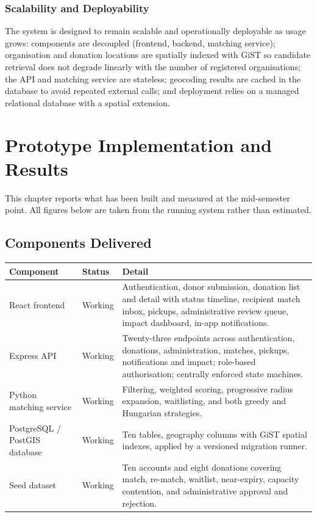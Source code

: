 \documentclass[12pt,a4paper]{report}
\begin{document}
\subsection{Scalability and Deployability}

The system is designed to remain scalable and operationally deployable as usage grows: components are decoupled (frontend, backend, matching service); organisation and donation locations are spatially indexed with GiST so candidate retrieval does not degrade linearly with the number of registered organisations; the API and matching service are stateless; geocoding results are cached in the database to avoid repeated external calls; and deployment relies on a managed relational database with a spatial extension.

\chapter{Prototype Implementation and Results}

This chapter reports what has been built and measured at the mid-semester point. All figures below are taken from the running system rather than estimated.

\section{Components Delivered}

\begin{longtable}{@{}p{3cm}p{2.2cm}p{8.3cm}@{}}
\toprule
\textbf{Component} & \textbf{Status} & \textbf{Detail} \\
\midrule
\endhead
React frontend & Working & Authentication, donor submission, donation list and detail with status timeline, recipient match inbox, pickups, administrative review queue, impact dashboard, in-app notifications. \\
Express API & Working & Twenty-three endpoints across authentication, donations, administration, matches, pickups, notifications and impact; role-based authorisation; centrally enforced state machines. \\
Python matching service & Working & Filtering, weighted scoring, progressive radius expansion, waitlisting, and both greedy and Hungarian strategies. \\
PostgreSQL / PostGIS database & Working & Ten tables, geography columns with GiST spatial indexes, applied by a versioned migration runner. \\
Seed dataset & Working & Ten accounts and eight donations covering match, re-match, waitlist, near-expiry, capacity contention, and administrative approval and rejection. \\
\bottomrule
\end{longtable}
\end{document}
